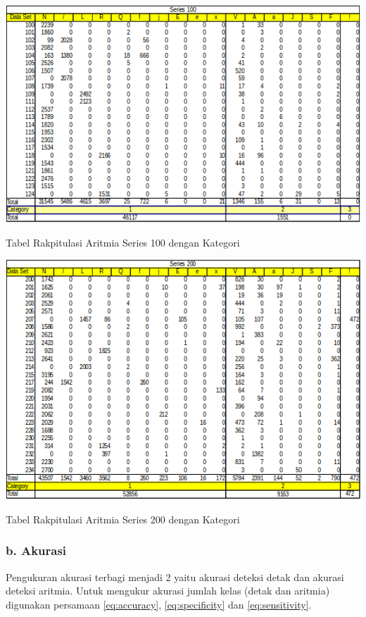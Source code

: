 \begin{table}[H]
	\centering
	\includegraphics[scale=0.75]{images/result1.png}
	\caption{Tabel Rakpitulasi Aritmia Series 100 dengan Kategori}
	\label{tabel:result1}
\end{table}
\begin{table}[H]
	\centering
	\includegraphics[scale=0.75]{images/result2.png}
	\caption{Tabel Rakpitulasi Aritmia Series 200 dengan Kategori}
	\label{tabel:result2}
\end{table}

\subsubsection{b. Akurasi}
Pengukuran akurasi terbagi menjadi 2 yaitu akurasi deteksi detak dan akurasi deteksi aritmia. Untuk mengukur akurasi jumlah kelas (detak dan aritmia) digunakan persamaan \ref{eq:accuracy}, \ref{eq:specificity} dan \ref{eq:sensitivity}.

